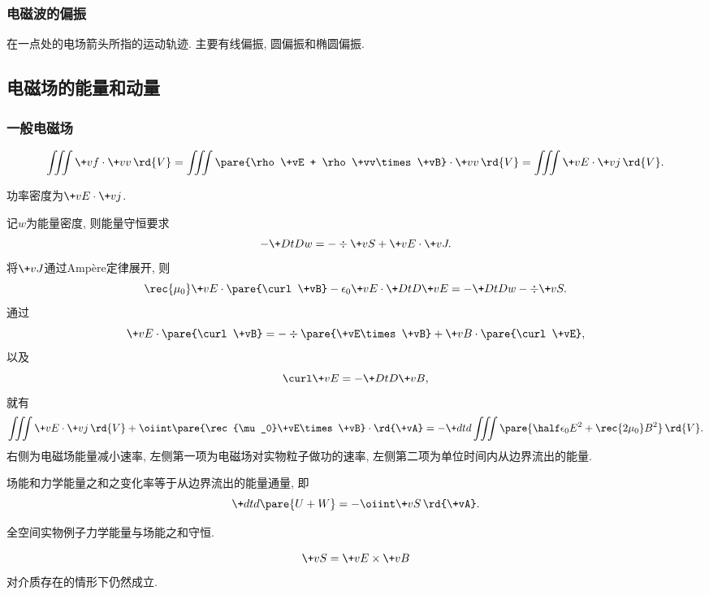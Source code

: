 \documentclass[hidelinks]{ctexart}
\begin{document}

\subsubsection{电磁波的偏振} %
\label{ssub:电磁波的偏振}

在一点处的电场箭头所指的运动轨迹. 主要有线偏振, 圆偏振和椭圆偏振.



\subsection{电磁场的能量和动量} %
\label{sub:电磁场的能量和动量}

\subsubsection{一般电磁场} %
\label{ssub:一般电磁场}

\[ \iiint \+vf\cdot\+vv\,\rd{V} = \iiint \pare{\rho \+vE + \rho \+vv\times \+vB}\cdot \+vv \,\rd{V} = \iiint \+vE \cdot \+vj\,\rd{V}. \]
\begin{finale}
    \begin{theorem}
        功率密度为$\+vE\cdot\+vj$.
    \end{theorem}
\end{finale}
记$w$为能量密度, 则能量守恒要求
\[ -\+DtDw = -\div \+vS + \+vE \cdot \+vJ. \]
将$\+vJ$通过Amp\`ere定律展开, 则
\[ \rec{\mu_0} \+vE\cdot\pare{\curl\+vB} - \epsilon_0\+vE\cdot\+DtD{\+vE} = -\+DtDw - \div \+vS. \]
通过
\[ \+vE\cdot\pare{\curl\+vB} = -\div\pare{\+vE\times\+vB} + \+vB\cdot\pare{\curl\+vE}, \]
以及
\[ \curl\+vE = -\+DtD{\+vB}, \]
就有
\[ \iiint \+vE\cdot\+vj\,\rd{V} + \oiint\pare{\rec{\mu_0}\+vE\times\+vB}\cdot\rd{\+vA} = -\+dtd{}\iiint\pare{\half \epsilon_0 E^2 + \rec{2\mu_0}B^2}\,\rd{V}. \]
右侧为电磁场能量减小速率, 左侧第一项为电磁场对实物粒子做功的速率, 左侧第二项为单位时间内从边界流出的能量.
\begin{finale}
    \begin{theorem}
        [Poynting定理]场能和力学能量之和之变化率等于从边界流出的能量通量, 即
        \[ \+dtd{\pare{U+W}} = -\oiint \+vS\,\rd{\+vA}. \]
    \end{theorem}
    \begin{corollary}
        全空间实物例子力学能量与场能之和守恒.
    \end{corollary}
\end{finale}
\begin{finale}
    \[ \+vS = \+vE \times \+vB \]
    对介质存在的情形下仍然成立.
\end{finale}
\end{document}
